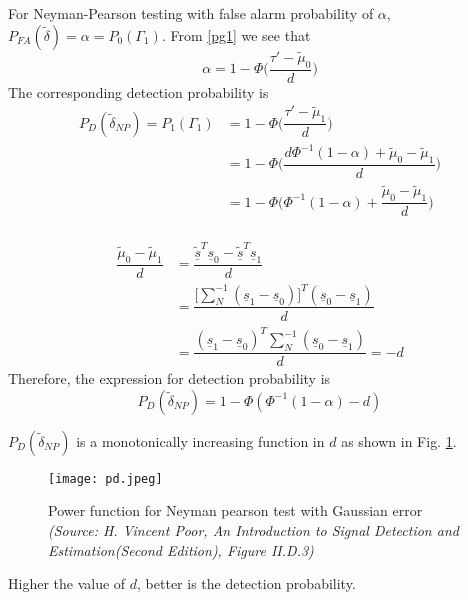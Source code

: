 \documentclass[a4paper,english,12pt]{article}
\begin{document}
\begin{exmp}
For Neyman-Pearson testing with false alarm probability of $\alpha$, 
$P_{FA}(\tilde{\delta})=\alpha = P_0(\Gamma_1)$. From \eqref{pg1} we see that
\begin{equation}
\alpha = 1- \Phi \Big( \dfrac{\tau'-\tilde{\mu}_0}{d} \Big)
\end{equation} 
The corresponding detection probability is 
\begin{align*}
P_D (\tilde{\delta}_{NP}) =P_1(\Gamma_1) &= 1- \Phi \Big( \dfrac{\tau'-\tilde{\mu}_1}{d} \Big) \\
&= 1-\Phi \Big( \dfrac{d\Phi^{-1}(1-\alpha) + \tilde{\mu}_0 - \tilde{\mu}_1}{d} \Big) \\
&=1-\Phi\Big( \Phi^{-1}(1-\alpha) + \dfrac{\tilde{\mu}_0 - \tilde{\mu}_1}{d} \Big) \\
\end{align*}

\begin{align*}
\dfrac{\tilde{\mu}_0 - \tilde{\mu}_1}{d} &= \dfrac{\tilde{\underline{s}}^T\underline{s}_0 - \tilde{\underline{s}}^T\underline{s}_1}{d} \\
&=\dfrac{\Big[ \sum\nolimits_N^{-1} (\underline{s}_1-\underline{s}_0) \Big]^T(\underline{s}_0-\underline{s}_1)}{d} \\
&= \dfrac{(\underline{s}_1 - \underline{s}_0)^T \sum\nolimits_N^{-1} (\underline{s}_0 - \underline{s}_1)}{d} = -d
\end{align*}
Therefore, the expression for detection probability is
\begin{equation}
P_D(\tilde{\delta}_{NP})=1-\Phi (\Phi ^{-1} (1-\alpha) - d)
\end{equation}

\end{exmp}
\begin{note}
$P_D(\tilde{\delta}_{NP})$ is a monotonically increasing function in $d$ as shown in Fig. \ref{pNP}.
\begin{figure}[hbtp]
\centering
\texttt{[image: pd.jpeg]}
\caption{Power function for Neyman pearson test with Gaussian error \\ \textit{(Source: H. Vincent Poor, An Introduction to Signal Detection and Estimation(Second
Edition), Figure II.D.3)}}
\label{pNP}
\end{figure}
Higher the value of $d$, better is the detection probability.
\end{note}
\end{document}
